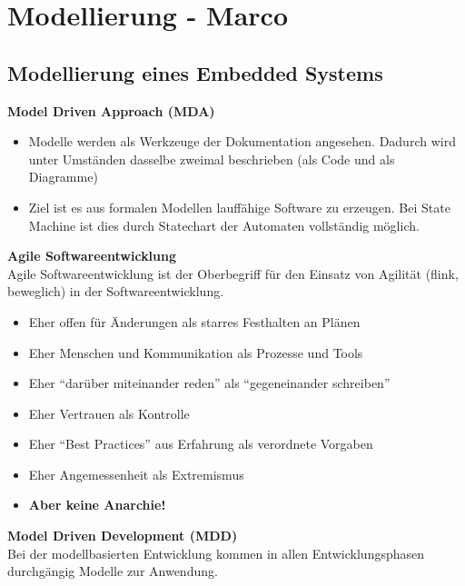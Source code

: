 \section{Modellierung - Marco}
\subsection{Modellierung eines Embedded Systems}

\textbf{Model Driven Approach (MDA)}
\begin{itemize}
	\item Modelle werden als Werkzeuge der Dokumentation angesehen. Dadurch wird unter Umständen dasselbe zweimal beschrieben (als Code und als Diagramme)
	
	\item Ziel ist es aus formalen Modellen lauffähige Software zu erzeugen. Bei State Machine ist dies durch Statechart der Automaten vollständig möglich.
\end{itemize}

\textbf{Agile Softwareentwicklung}\\
Agile Softwareentwicklung ist der Oberbegriff für den Einsatz von Agilität (flink, beweglich) in der Softwareentwicklung.
\begin{itemize}
	\item Eher offen für Änderungen als starres Festhalten an Plänen
	\item Eher Menschen und Kommunikation als Prozesse und Tools
	\item Eher "`darüber miteinander reden"' als "`gegeneinander schreiben"'
	\item Eher Vertrauen als Kontrolle
	\item Eher "`Best Practices"' aus Erfahrung als verordnete Vorgaben
	\item Eher Angemessenheit als Extremismus
	\item \textbf{Aber keine Anarchie!}
\end{itemize} 


\textbf{Model Driven Development (MDD)}\\
Bei der modellbasierten Entwicklung kommen in allen Entwicklungsphasen durchgängig Modelle zur Anwendung.

